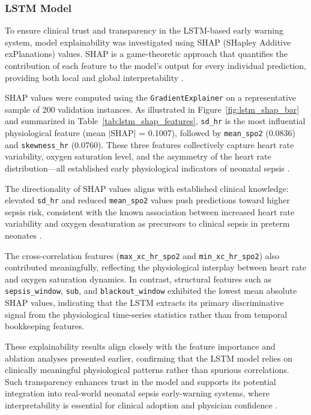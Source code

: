\documentclass[conference]{IEEEtran}
\begin{document}
\subsubsection{LSTM Model}

To ensure clinical trust and transparency in the LSTM-based 
early warning system, model explainability was investigated 
using SHAP (SHapley Additive exPlanations) values. SHAP is a 
game-theoretic approach that quantifies the contribution of 
each feature to the model's output for every individual 
prediction, providing both local and global interpretability 
\cite{Nemati2018Interpretable}.

SHAP values were computed using the \texttt{GradientExplainer} 
on a representative sample of 200 validation instances. As 
illustrated in Figure~\ref{fig:lstm_shap_bar} and summarized 
in Table~\ref{tab:lstm_shap_features}, \texttt{sd\_hr} is the 
most influential physiological feature (mean $|$SHAP$|$ = 0.1007), 
followed by \texttt{mean\_spo2} (0.0836) and 
\texttt{skewness\_hr} (0.0760). These three features collectively 
capture heart rate variability, oxygen saturation level, and the 
asymmetry of the heart rate distribution—all established early 
physiological indicators of neonatal sepsis 
\cite{hero_monitoring,vital_sign_ml,Shashikumar2017EarlySepsis}.

The directionality of SHAP values aligns with established 
clinical knowledge: elevated \texttt{sd\_hr} and reduced 
\texttt{mean\_spo2} values push predictions toward higher 
sepsis risk, consistent with the known association between 
increased heart rate variability and oxygen desaturation as 
precursors to clinical sepsis in preterm neonates 
\cite{hero_monitoring,Shashikumar2017EarlySepsis,
VanWyk2019Physiomarkers}.

The cross-correlation features 
(\texttt{max\_xc\_hr\_spo2} and \texttt{min\_xc\_hr\_spo2}) 
also contributed meaningfully, reflecting the physiological 
interplay between heart rate and oxygen saturation dynamics. 
In contrast, structural features such as \texttt{sepsis\_window}, 
\texttt{sub}, and \texttt{blackout\_window} exhibited the lowest 
mean absolute SHAP values, indicating that the LSTM extracts 
its primary discriminative signal from the physiological 
time-series statistics rather than from temporal bookkeeping 
features.

These explainability results align closely with the feature 
importance and ablation analyses presented earlier, confirming 
that the LSTM model relies on clinically meaningful 
physiological patterns rather than spurious correlations. 
Such transparency enhances trust in the model and supports 
its potential integration into real-world neonatal sepsis 
early-warning systems, where interpretability is essential 
for clinical adoption and physician confidence 
\cite{Nemati2018Interpretable,Saria2019SafeML}.
\end{document}
